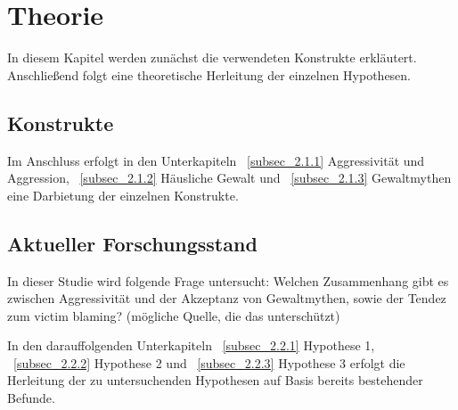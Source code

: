 

\chapter{Theorie}   \label{ch_2}
In diesem Kapitel werden zunächst die verwendeten Konstrukte erkläutert. Anschließend folgt
eine theoretische Herleitung der einzelnen Hypothesen.

\section{Konstrukte}    \label{sec_2.1}
Im Anschluss erfolgt in den Unterkapiteln ~\ref{subsec_2.1.1} Aggressivität und Aggression, 
~\ref{subsec_2.1.2} Häusliche Gewalt und ~\ref{subsec_2.1.3} Gewaltmythen eine Darbietung der 
einzelnen Konstrukte.





\section{Aktueller Forschungsstand}   \label{sec_2.2}
In dieser Studie wird folgende Frage untersucht: Welchen Zusammenhang gibt es zwischen
Aggressivität und der Akzeptanz von Gewaltmythen, sowie der Tendez zum victim blaming?
(mögliche Quelle, die das unterschützt) 

In den darauffolgenden Unterkapiteln 
~\ref{subsec_2.2.1} Hypothese 1, ~\ref{subsec_2.2.2} Hypothese 2 und ~\ref{subsec_2.2.3} 
Hypothese 3 erfolgt die Herleitung der zu untersuchenden Hypothesen auf Basis bereits 
bestehender Befunde.



